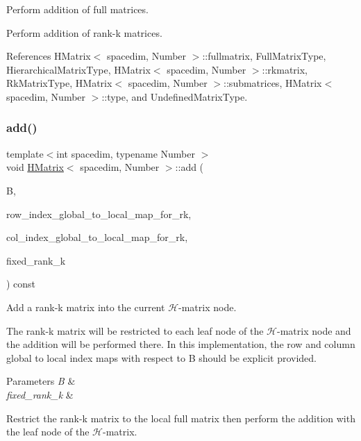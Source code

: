 Perform addition of full matrices.

Perform addition of rank-\/k matrices.

References H\+Matrix$<$ spacedim, Number $>$\+::fullmatrix, Full\+Matrix\+Type, Hierarchical\+Matrix\+Type, H\+Matrix$<$ spacedim, Number $>$\+::rkmatrix, Rk\+Matrix\+Type, H\+Matrix$<$ spacedim, Number $>$\+::submatrices, H\+Matrix$<$ spacedim, Number $>$\+::type, and Undefined\+Matrix\+Type.

\mbox{\label{classHMatrix_a1793dff400aeae649f909d7f45db8b8a}} 
\subsubsection{\texorpdfstring{add()}{add()}\hspace{0.1cm}{\footnotesize\ttfamily [5/10]}}
{\footnotesize\ttfamily template$<$int spacedim, typename Number $>$ \\
void \hyperlink{classHMatrix}{H\+Matrix}$<$ spacedim, Number $>$\+::add (\begin{DoxyParamCaption}\item[{const \hyperlink{classRkMatrix}{Rk\+Matrix}$<$ Number $>$ \&}]{B,  }\item[{const std\+::map$<$ types\+::global\+\_\+dof\+\_\+index, size\+\_\+t $>$ \&}]{row\+\_\+index\+\_\+global\+\_\+to\+\_\+local\+\_\+map\+\_\+for\+\_\+rk,  }\item[{const std\+::map$<$ types\+::global\+\_\+dof\+\_\+index, size\+\_\+t $>$ \&}]{col\+\_\+index\+\_\+global\+\_\+to\+\_\+local\+\_\+map\+\_\+for\+\_\+rk,  }\item[{const \hyperlink{classHMatrix_a5ca8dc549783d38371a01ecd621ecb34}{size\+\_\+type}}]{fixed\+\_\+rank\+\_\+k }\end{DoxyParamCaption}) const}

Add a rank-\/k matrix into the current $\mathcal{H}$-\/matrix node.

The rank-\/k matrix will be restricted to each leaf node of the $\mathcal{H}$-\/matrix node and the addition will be performed there. In this implementation, the row and column global to local index maps with respect to {\ttfamily B} should be explicit provided.


\begin{DoxyParams}{Parameters}
{\em B} & \\
\hline
{\em fixed\+\_\+rank\+\_\+k} & \\
\hline
\end{DoxyParams}
Restrict the rank-\/k matrix to the local full matrix then perform the addition with the leaf node of the $\mathcal{H}$-\/matrix.

